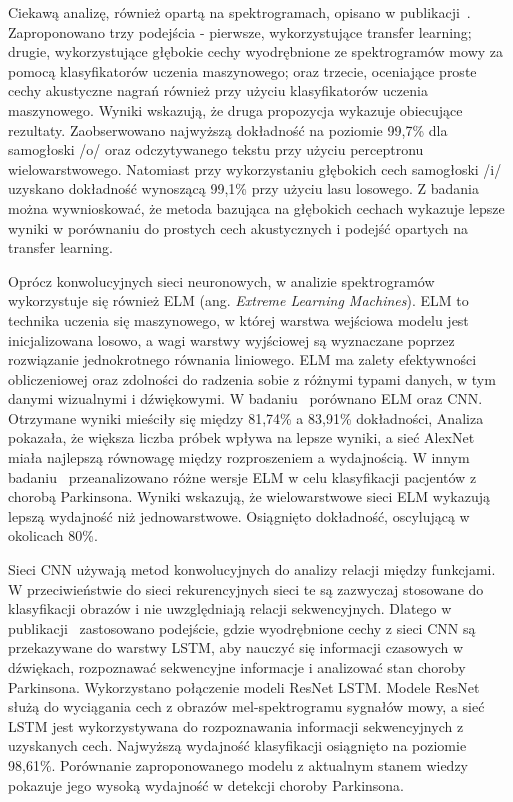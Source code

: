 Ciekawą analizę, również opartą na spektrogramach, opisano w publikacji~\cite{8999815}.
Zaproponowano trzy podejścia - pierwsze, wykorzystujące transfer learning; drugie, wykorzystujące głębokie cechy wyodrębnione ze
spektrogramów mowy za pomocą klasyfikatorów uczenia maszynowego; oraz trzecie, oceniające
proste cechy akustyczne nagrań również przy użyciu klasyfikatorów uczenia maszynowego.
Wyniki wskazują, że druga propozycja wykazuje obiecujące rezultaty.
Zaobserwowano najwyższą dokładność na poziomie 99,7\% dla samogłoski /o/ oraz odczytywanego tekstu przy użyciu perceptronu wielowarstwowego.
Natomiast przy wykorzystaniu głębokich cech samogłoski /i/ uzyskano dokładność wynoszącą 99,1\% przy użyciu lasu losowego.
Z badania można wywnioskować, że metoda bazująca na głębokich cechach wykazuje lepsze wyniki w porównaniu do prostych cech akustycznych i
podejść opartych na transfer learning.

Oprócz konwolucyjnych sieci neuronowych, w analizie spektrogramów wykorzystuje się również ELM (ang. \emph{Extreme Learning Machines}).
ELM to technika uczenia się maszynowego, w której warstwa wejściowa modelu jest inicjalizowana losowo, a wagi warstwy wyjściowej są wyznaczane
poprzez rozwiązanie jednokrotnego równania liniowego.
ELM ma zalety efektywności obliczeniowej oraz zdolności do radzenia sobie z różnymi typami danych,
w tym danymi wizualnymi i dźwiękowymi.
W badaniu~\cite{GUATELLI2023106700} porównano ELM oraz CNN\@.
Otrzymane wyniki mieściły się między 81,74\% a 83,91\% dokładności,
Analiza pokazała, że większa liczba próbek wpływa na lepsze wyniki, a sieć AlexNet miała najlepszą równowagę między rozproszeniem a wydajnością.
W innym badaniu~\cite{Gelvez-Almeida_2022} przeanalizowano różne wersje ELM w celu klasyfikacji pacjentów z chorobą Parkinsona.
Wyniki wskazują, że wielowarstwowe sieci ELM wykazują lepszą wydajność niż jednowarstwowe.
Osiągnięto dokładność, oscylującą w okolicach 80\%.

Sieci CNN używają metod konwolucyjnych do analizy relacji między funkcjami.
W przeciwieństwie do sieci rekurencyjnych sieci te są zazwyczaj stosowane do klasyfikacji obrazów i nie uwzględniają relacji sekwencyjnych.
Dlatego w publikacji~\cite{ER2021103006} zastosowano podejście, gdzie wyodrębnione cechy z sieci CNN są przekazywane do warstwy LSTM, aby nauczyć się
informacji czasowych w dźwiękach, rozpoznawać sekwencyjne informacje i analizować stan choroby Parkinsona.
Wykorzystano połączenie modeli ResNet LSTM\@.
Modele ResNet służą do wyciągania cech z obrazów mel-spektrogramu sygnałów mowy, a
sieć LSTM jest wykorzystywana do rozpoznawania informacji sekwencyjnych z uzyskanych cech.
Najwyższą wydajność klasyfikacji osiągnięto na poziomie 98,61\%.
Porównanie zaproponowanego modelu z aktualnym stanem wiedzy pokazuje jego wysoką wydajność w detekcji choroby Parkinsona.

